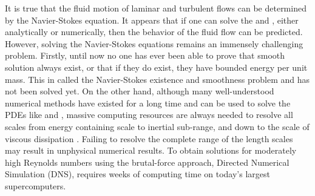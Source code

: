 It is true that the fluid motion of laminar and turbulent flows can be determined by the Navier-Stokes equation. It appears that if one can solve the  and , either analytically or numerically, then the behavior of the fluid flow can be predicted. However, solving the Navier-Stokes equations remains an immensely challenging problem. Firstly, until now no one has ever been able to prove that smooth solution always exist, or that if they do exist, they have bounded energy per unit mass. This in called the Navier-Stokes existence and smoothness problem and has not been solved yet. On the other hand, although many well-understood numerical methods have existed for a long time and can be used to solve the PDEs like  and , massive computing resources are always needed to resolve all scales from energy containing scale to inertial sub-range, and down to the scale of viscous dissipation \cite{PopeTurbulence2000}. Failing to resolve the complete range of the length scales may result in unphysical numerical results. To obtain solutions for moderately high Reynolds numbers using the brutal-force approach, Directed Numerical Simulation (DNS), requires weeks of computing time on today's largest supercomputers. 

